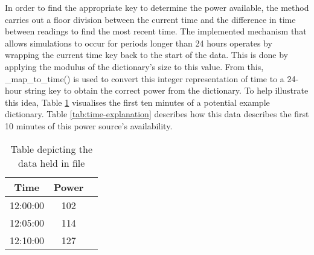 \documentclass{l4proj}
\begin{document}
In order to find the appropriate key to determine the power available, the method carries out a floor division between the current time and the difference in time between readings to find the most recent time.
The implemented mechanism that allows simulations to occur for periods longer than 24 hours operates by wrapping the current time key back to the start of the data.
This is done by applying the modulus of the dictionary's size to this value.
From this, \_map\_to\_time() is used to convert this integer representation of time to a 24-hour string key to obtain the correct power from the dictionary.
To help illustrate this idea, Table \ref{tab:data-dic} visualises the first ten minutes of a potential example dictionary.
Table \ref{tab:time-explanation} describes how this data describes the first 10 minutes of this power source's availability.
\begin{table}[h]
    \caption{Table depicting the data held in file}
    \label{tab:data-dic}
    \centering
    \begin{tabular}{@{}ccc@{}}
    \toprule
    \textbf{Time} & \textbf{Power} \\
    \midrule
    12:00:00      & 102            \\
    12:05:00      & 114            \\
    12:10:00      & 127            \\
    \bottomrule
    \end{tabular}


\end{table}
\end{document}
